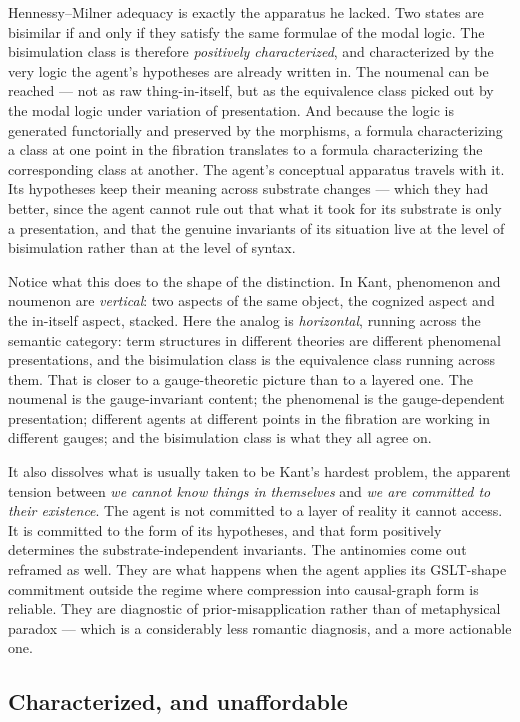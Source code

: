 Hennessy--Milner adequacy is exactly the apparatus he lacked.
Two states are bisimilar if and only if they satisfy the same
formulae of the modal logic.
The bisimulation class is therefore \emph{positively
characterized}, and characterized by the very logic the agent's
hypotheses are already written in.
The noumenal can be reached --- not as raw thing-in-itself, but as
the equivalence class picked out by the modal logic under variation
of presentation.
And because the logic is generated functorially and preserved by
the morphisms, a formula characterizing a class at one point in the
fibration translates to a formula characterizing the corresponding
class at another.
The agent's conceptual apparatus travels with it.
Its hypotheses keep their meaning across substrate changes --- which
they had better, since the agent cannot rule out that what it took
for its substrate is only a presentation, and that the genuine
invariants of its situation live at the level of bisimulation
rather than at the level of syntax.

Notice what this does to the shape of the distinction.
In Kant, phenomenon and noumenon are \emph{vertical}: two aspects of
the same object, the cognized aspect and the in-itself aspect,
stacked.
Here the analog is \emph{horizontal}, running across the semantic
category: term structures in different theories are different
phenomenal presentations, and the bisimulation class is the
equivalence class running across them.
That is closer to a gauge-theoretic picture than to a layered one.
The noumenal is the gauge-invariant content; the phenomenal is the
gauge-dependent presentation; different agents at different points
in the fibration are working in different gauges; and the
bisimulation class is what they all agree on.

It also dissolves what is usually taken to be Kant's hardest
problem, the apparent tension between \emph{we cannot know things
in themselves} and \emph{we are committed to their existence}.
The agent is not committed to a layer of reality it cannot access.
It is committed to the form of its hypotheses, and that form
positively determines the substrate-independent invariants.
The antinomies come out reframed as well.
They are what happens when the agent applies its GSLT-shape
commitment outside the regime where compression into causal-graph
form is reliable.
They are diagnostic of prior-misapplication rather than of
metaphysical paradox --- which is a considerably less romantic
diagnosis, and a more actionable one.

\subsection{Characterized, and unaffordable}
\label{sec:kant-affordable}

